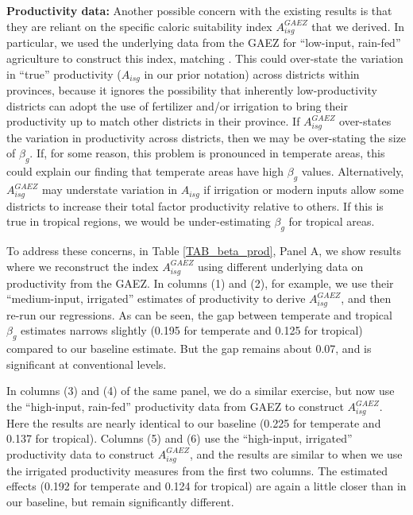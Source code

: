 \documentclass[11pt]{article}
\begin{document}
\vspace{.5cm}\noindent\textbf{Productivity data:} Another possible concern with the existing results is that they are reliant on the specific caloric suitability index $A_{isg}^{GAEZ}$ that we derived. In particular, we used the underlying data from the GAEZ for ``low-input, rain-fed'' agriculture to construct this index, matching \cite{galorozak2016}. This could over-state the variation in ``true'' productivity ($A_{isg}$ in our prior notation) across districts within provinces, because it ignores the possibility that inherently low-productivity districts can adopt the use of fertilizer and/or irrigation to bring their productivity up to match other districts in their province. If $A_{isg}^{GAEZ}$ over-states the variation in productivity across districts, then we may be over-stating the size of $\beta_g$. If, for some reason, this problem is pronounced in temperate areas, this could explain our finding that temperate areas have high $\beta_g$ values. Alternatively, $A_{isg}^{GAEZ}$ may understate variation in $A_{isg}$ if irrigation or modern inputs allow some districts to increase their total factor productivity relative to others. If this is true in tropical regions, we would be under-estimating $\beta_g$ for tropical areas.

To address these concerns, in Table \ref{TAB_beta_prod}, Panel A, we show results where we reconstruct the index $A_{isg}^{GAEZ}$ using different underlying data on productivity from the GAEZ. In columns (1) and (2), for example, we use their ``medium-input, irrigated'' estimates of productivity to derive $A_{isg}^{GAEZ}$, and then re-run our regressions. As can be seen, the gap between temperate and tropical $\beta_g$ estimates narrows slightly (0.195 for temperate and 0.125 for tropical) compared to our baseline estimate. But the gap remains about 0.07, and is significant at conventional levels.

In columns (3) and (4) of the same panel, we do a similar exercise, but now use the ``high-input, rain-fed'' productivity data from GAEZ to construct $A_{isg}^{GAEZ}$. Here the results are nearly identical to our baseline (0.225 for temperate and 0.137 for tropical). Columns (5) and (6) use the ``high-input, irrigated'' productivity data to construct $A_{isg}^{GAEZ}$, and the results are similar to when we use the irrigated productivity measures from the first two columns. The estimated effects (0.192 for temperate and 0.124 for tropical) are again a little closer than in our baseline, but remain significantly different.
\end{document}

